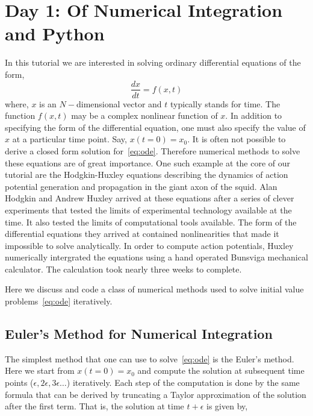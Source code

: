\documentclass[10pt,letterpaper]{article}
\begin{document}


\section*{Day 1: Of Numerical Integration and Python}
In this tutorial we are interested in solving ordinary differential equations of the form,
\begin{equation}
\frac{dx}{dt} = f(x, t)
\label{eq:ode}
\end{equation}
where, $x$ is an $N-$dimensional vector and $t$ typically stands for time. The function $f(x,t)$ may be a complex nonlinear function of $x$. In addition to specifying the form of the differential equation, one must also specify the value of $x$ at a particular time point. Say, $x(t=0)=x_{0}$. It is often not possible to derive a closed form solution for~\ref{eq:ode}. Therefore numerical methods to solve these equations are of great importance. One such example at the core of our tutorial are the Hodgkin-Huxley equations describing the dynamics of action potential generation and propagation in the giant axon of the squid. Alan Hodgkin and Andrew Huxley arrived at these equations after a series of clever experiments that tested the limits of experimental technology available at the time. It also tested the limits of computational tools available. The form of the differential equations they arrived at contained nonlinearities that made it impossible to solve analytically. In order to compute action potentials, Huxley numerically intergrated the equations using a hand operated Bunsviga mechanical calculator. The calculation took nearly three weeks to complete. 

Here we discuss and code a class of numerical methods used to solve initial value problems~\ref{eq:ode} iteratively. 

\subsection*{Euler's Method for Numerical Integration}
The simplest method that one can use to solve~\ref{eq:ode} is the Euler's method. Here we start from $x(t=0)=x_{0}$ and compute the solution at subsequent time points ($\epsilon,2\epsilon,3\epsilon \dots $) iteratively. Each step of the computation is done by the same formula that can be derived by truncating a Taylor approximation of the solution after the first term. That is, the solution at time $t+\epsilon$ is given by,
\end{document}
